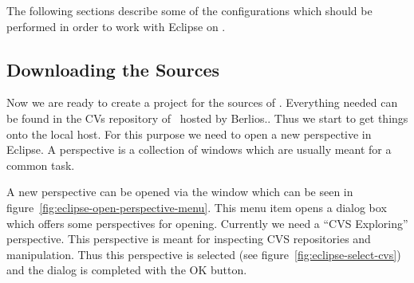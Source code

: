 The following sections describe some of the configurations which
should be performed in order to work with Eclipse on \ExTeX.


\subsection{Downloading the Sources}

Now we are ready to create a project for the sources of \ExTeX.
Everything needed can be found in the CVs repository of \ExTeX\ hosted
by Berlios.. Thus we start to get things onto the local host. For this
purpose we need to open a new perspective in Eclipse. A perspective is
a collection of windows which are usually meant for a common task.

A new perspective can be opened via the window  which can be seen in
figure~\ref{fig:eclipse-open-perspective-menu}. This menu item opens a
dialog box which offers some perspectives for opening. Currently we
need a ``CVS Exploring'' perspective. This perspective is meant for
inspecting CVS repositories and manipulation. Thus this perspective is
selected (see figure~\ref{fig:eclipse-select-cvs}) and the dialog is
completed with the OK button.
